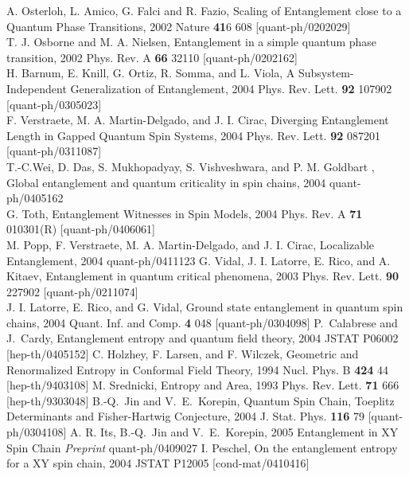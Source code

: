 \documentclass[12pt,preprint,tighten,eqsecnum,aps,floats,psfig,epsfig,amsmath,onecolumn]{revtex4-1}
\begin{document}
{\begin{thebibliography}{99}

A. Osterloh, L. Amico, G. Falci and R. Fazio,
Scaling of Entanglement close to a Quantum Phase Transitions,
2002 Nature {\bf 41}6 608 [quant-ph/0202029]\\
T. J. Osborne and M. A. Nielsen,
Entanglement in a simple quantum phase transition,
2002 Phys. Rev. A {\bf 66} 32110 [quant-ph/0202162]\\
H. Barnum, E. Knill, G. Ortiz, R. Somma, and L. Viola, 
A Subsystem-Independent Generalization of Entanglement,
2004 Phys. Rev. Lett. {\bf 92} 107902 [quant-ph/0305023]\\
F. Verstraete, M. A. Martin-Delgado, and J. I. Cirac,
Diverging Entanglement Length in Gapped Quantum Spin Systems,
2004 Phys. Rev. Lett. {\bf 92} 087201 [quant-ph/0311087]\\
T.-C.Wei, D. Das, S. Mukhopadyay, S. Vishveshwara, and P. M. Goldbart ,
Global entanglement and quantum criticality in spin chains,
2004 quant-ph/0405162\\
G. Toth, Entanglement Witnesses in Spin Models, 
2004 Phys. Rev. A {\bf 71} 010301(R) [quant-ph/0406061]\\
M. Popp, F. Verstraete, M. A. Martin-Delgado, and J. I. Cirac,
Localizable Entanglement, 2004 quant-ph/0411123
%
G. Vidal, J. I. Latorre, E. Rico, and A. Kitaev,
Entanglement in quantum critical phenomena,
2003 Phys. Rev. Lett. {\bf 90} 227902 [quant-ph/0211074]\\
J. I. Latorre, E. Rico, and G. Vidal,
Ground state entanglement in quantum spin chains,
2004 Quant. Inf. and Comp. {\bf 4} 048 [quant-ph/0304098]
%
P.~Calabrese and J.~Cardy,
Entanglement entropy and quantum field theory, 2004 
JSTAT P06002 [hep-th/0405152]
%
 C. Holzhey, F. Larsen, and F. Wilczek,
Geometric and Renormalized Entropy in Conformal Field Theory,
1994 Nucl. Phys. B {\bf 424} 44 [hep-th/9403108]
%
 M. Srednicki, Entropy and Area, 
1993 Phys. Rev. Lett. {\bf 71} 666 [hep-th/9303048]
%
B.-Q.~Jin and V.~E.~Korepin,
Quantum Spin Chain, Toeplitz Determinants and Fisher-Hartwig Conjecture,
2004 J. Stat. Phys. {\bf 116} 79 [quant-ph/0304108]
%
A. R. Its, B.-Q.~Jin and V.~E.~Korepin, 
2005 Entanglement in XY Spin Chain {\it Preprint} quant-ph/0409027
%
I. Peschel, On the entanglement entropy for a XY spin chain, 
2004 JSTAT P12005 [cond-mat/0410416]




\end{thebibliography}}
\end{document}
